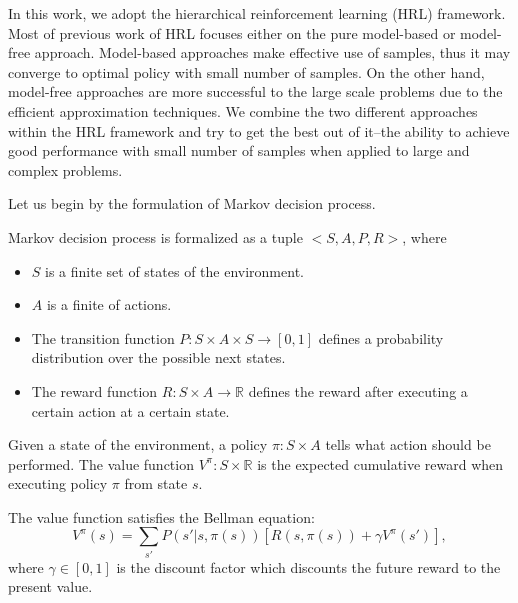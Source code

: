 In this work, we adopt the hierarchical reinforcement learning (HRL) framework.
Most of previous work of HRL focuses either on the pure model-based or model-free approach.
Model-based approaches make effective use of samples, thus it may converge to optimal
policy with small number of samples. On the other hand, model-free approaches are more 
successful to the large scale problems due to the efficient approximation techniques.
We combine the two different approaches within the HRL framework and try to get the best out 
of it--the ability to achieve good performance with small number of samples when applied
to large and complex problems.

Let us begin by the formulation of Markov decision process.

\begin{definition} Markov decision process is formalized as a tuple $<S, A, P, R>$, where
\begin{itemize}{}
\item $S$ is a finite set of states of the environment.
\item $A$ is a finite of actions.
\item The transition function $P:S \times A \times S \rightarrow [0, 1]$ defines a probability distribution over the possible next states. 
\item The reward function $R:S \times A \rightarrow \mathbb{R}$ defines the reward after executing a certain action at a certain state.
\end{itemize}
\end{definition}

Given a state of the environment, a policy $\pi: S \times A$ tells what action should be performed. 
The value function $V^{\pi}: S \times \mathbb{R}$ is the expected cumulative reward when executing
policy $\pi$ from state $s$.

The value function satisfies the Bellman equation:
\begin{equation}
    V^{\pi}(s) = \sum_{s'}P(s'|s, \pi(s))[R(s, \pi(s)) + \gamma V^{\pi}(s')],
    \label{eq:V}
\end{equation}
where $\gamma \in [0, 1]$ is the discount factor which discounts the future reward to the present value.

